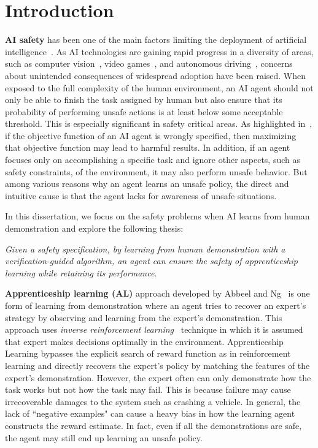 \chapter{Introduction}
\label{chapter:Introduction}
\thispagestyle{myheadings}
{\bf AI safety} has been one of the main factors limiting the deployment of artificial intelligence~\cite{Bundy:2017:PFA:3086243.3086264}. As AI technologies are gaining rapid progress in a diversity of areas, such as computer vision~\cite{krizhevsky2012imagenet}, video games~\cite{mnih2015human}, and autonomous driving~\cite{levinson2011towards}, concerns about unintended consequences of widespread adoption have been raised. When exposed to the full complexity of the human environment, an AI agent should not only be able to finish the task assigned by human but also ensure that its probability of performing unsafe actions is at least below some acceptable threshold. This is especially significant in safety critical areas. As highlighted in~\cite{AmodeiOSCSM16}, if the objective function of an AI agent is wrongly specified, then maximizing that objective function may lead to harmful results. In addition, if an agent focuses only on accomplishing a specific task and ignore other aspects, such as safety constraints, of the environment, it may also perform unsafe behavior. But among various reasons why an agent learns an unsafe policy, the direct and intuitive cause is that the agent lacks for awareness of unsafe situations.  

In this dissertation, we focus on the safety problems when AI learns from human demonstration and explore the following thesis:

\emph {
Given a safety specification, by learning from human demonstration with a verification-guided algorithm, an agent can ensure the safety of apprenticeship learning while retaining its performance. 
} 

{\bf Apprenticeship learning (AL)} approach developed by Abbeel and Ng~\cite{Abbeel:2004:ALV:1015330.1015430} is one form of learning from demonstration where an agent tries to recover an expert's strategy by observing and learning from the expert's demonstration. This approach uses {\it inverse reinforcement learning}~\cite{Ng:2000:AIR:645529.657801} technique in which it is assumed that expert makes decisions optimally in the environment. Apprenticeship Learning bypasses the explicit search of reward function as in reinforcement learning and directly recovers the expert's policy by matching the features of the expert's demonstration. However, the expert often can only demonstrate how the task works but not how the task may fail. This is because failure may cause irrecoverable damages to the system such as crashing a vehicle. In general, the lack of ``negative examples" can cause a heavy bias in how the learning agent constructs the reward estimate. In fact, even if all the demonstrations are safe, the agent may still end up learning an unsafe policy.

